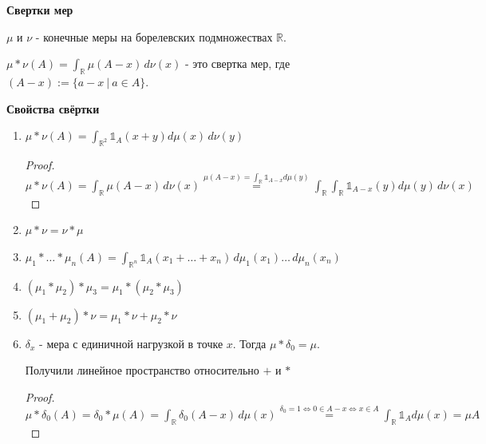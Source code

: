 \begin{remark}
    \textbf{Свертки мер}

    $\mu$ и $\nu$ - конечные меры на борелевских подмножествах $\mathbb{R}$.

    $\mu * \nu (A) = \int_{\mathbb{R}} \mu (A - x) \, d\nu (x)$ - это свертка мер, где $(A - x) := \{ a - x \ | \ a \in A \}$.

    \begin{properties}
        \textbf{Свойства свёртки}

        \begin{enumerate}
            \item {
                $\mu * \nu (A) = \int_{\mathbb{R}^2} \mathds{1}_A (x + y) d\mu (x) \, d\nu (y)$

                \begin{proof}
                    $\mu * \nu (A) = \int_{\mathbb{R}} \mu (A - x) \, d\nu (x) \overset{\mu (A - x) = \int_{\mathbb{R}} \mathds{1}_{A - x} d\mu (y) }{=}
                    \int_{\mathbb{R}} \int_{\mathbb{R}} \mathds{1}_{A - x} (y) d\mu (y) \, d\nu (x)$
                \end{proof}
            }
            \item {
                $\mu * \nu = \nu * \mu$
            }
            \item {
                $\mu_1 * \ldots * \mu_n (A) = \int_{\mathbb{R}^n} \mathds{1}_A (x_1 + \ldots + x_n) \, d\mu_1 (x_1) \ldots \, d \mu_n (x_n)$
            }
            \item {
                $(\mu_1 * \mu_2) * \mu_3 = \mu_1 * (\mu_2 * \mu_3)$
            }
            \item {
                $(\mu_1 + \mu_2) * \nu = \mu_1 * \nu + \mu_2 * \nu$
            }
            \item {
                $\delta_x$ - мера с единичной нагрузкой в точке $x$. Тогда $\mu * \delta_0 = \mu$.

                Получили линейное пространство относительно $+$ и $*$

                \begin{proof}
                    $\mu * \delta_0 (A) = \delta_0 * \mu (A) = \int_{\mathbb{R}} \delta_0 (A - x) \, d\mu (x)
                    \overset{\delta_0 = 1 \Leftrightarrow 0 \in A - x \Leftrightarrow x \in A}{=} \int_{\mathbb{R}} \mathds{1}_{A} d\mu (x) = \mu A$
                \end{proof}
            }
        \end{enumerate}
    \end{properties}
\end{remark}

